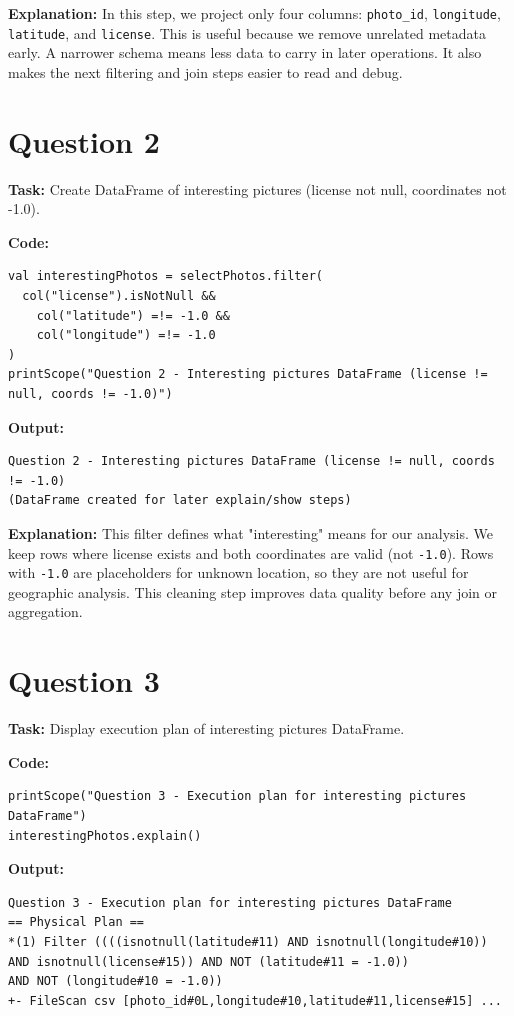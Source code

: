 \documentclass[11pt]{article}
\begin{document}
\textbf{Explanation:} In this step, we project only four columns: \texttt{photo\_id}, \texttt{longitude}, \texttt{latitude}, and \texttt{license}. This is useful because we remove unrelated metadata early. A narrower schema means less data to carry in later operations. It also makes the next filtering and join steps easier to read and debug.

\section*{Question 2}
\textbf{Task:} Create DataFrame of interesting pictures (license not null, coordinates not -1.0).

\textbf{Code:}
\begin{lstlisting}
val interestingPhotos = selectPhotos.filter(
  col("license").isNotNull &&
    col("latitude") =!= -1.0 &&
    col("longitude") =!= -1.0
)
printScope("Question 2 - Interesting pictures DataFrame (license != null, coords != -1.0)")
\end{lstlisting}

\textbf{Output:}
\begin{lstlisting}
Question 2 - Interesting pictures DataFrame (license != null, coords != -1.0)
(DataFrame created for later explain/show steps)
\end{lstlisting}

\textbf{Explanation:} This filter defines what "interesting" means for our analysis. We keep rows where license exists and both coordinates are valid (not \texttt{-1.0}). Rows with \texttt{-1.0} are placeholders for unknown location, so they are not useful for geographic analysis. This cleaning step improves data quality before any join or aggregation.

\section*{Question 3}
\textbf{Task:} Display execution plan of interesting pictures DataFrame.

\textbf{Code:}
\begin{lstlisting}
printScope("Question 3 - Execution plan for interesting pictures DataFrame")
interestingPhotos.explain()
\end{lstlisting}

\textbf{Output:}
\begin{lstlisting}
Question 3 - Execution plan for interesting pictures DataFrame
== Physical Plan ==
*(1) Filter ((((isnotnull(latitude#11) AND isnotnull(longitude#10))
AND isnotnull(license#15)) AND NOT (latitude#11 = -1.0))
AND NOT (longitude#10 = -1.0))
+- FileScan csv [photo_id#0L,longitude#10,latitude#11,license#15] ...
\end{lstlisting}
\end{document}
